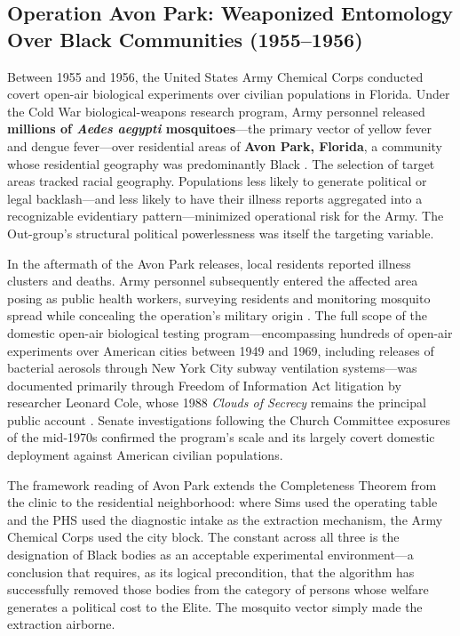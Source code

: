 \subsection{Operation Avon Park: Weaponized Entomology Over Black Communities (1955--1956)}
\label{subsec:avon_park}

Between 1955 and 1956, the United States Army Chemical Corps conducted covert open-air biological experiments over civilian populations in Florida. Under the Cold War biological-weapons research program, Army personnel released \textbf{millions of \textit{Aedes aegypti} mosquitoes}---the primary vector of yellow fever and dengue fever---over residential areas of \textbf{Avon Park, Florida}, a community whose residential geography was predominantly Black \cite{cole_clouds, washington_medical_apartheid}. The selection of target areas tracked racial geography. Populations less likely to generate political or legal backlash---and less likely to have their illness reports aggregated into a recognizable evidentiary pattern---minimized operational risk for the Army. The Out-group's structural political powerlessness was itself the targeting variable.

In the aftermath of the Avon Park releases, local residents reported illness clusters and deaths. Army personnel subsequently entered the affected area posing as public health workers, surveying residents and monitoring mosquito spread while concealing the operation's military origin \cite{cole_clouds}. The full scope of the domestic open-air biological testing program---encompassing hundreds of open-air experiments over American cities between 1949 and 1969, including releases of bacterial aerosols through New York City subway ventilation systems---was documented primarily through Freedom of Information Act litigation by researcher Leonard Cole, whose 1988 \textit{Clouds of Secrecy} remains the principal public account \cite{cole_clouds}. Senate investigations following the Church Committee exposures of the mid-1970s confirmed the program's scale and its largely covert domestic deployment against American civilian populations.

The framework reading of Avon Park extends the Completeness Theorem from the clinic to the residential neighborhood: where Sims used the operating table and the PHS used the diagnostic intake as the extraction mechanism, the Army Chemical Corps used the city block. The constant across all three is the designation of Black bodies as an acceptable experimental environment---a conclusion that requires, as its logical precondition, that the algorithm has successfully removed those bodies from the category of persons whose welfare generates a political cost to the Elite. The mosquito vector simply made the extraction airborne.

